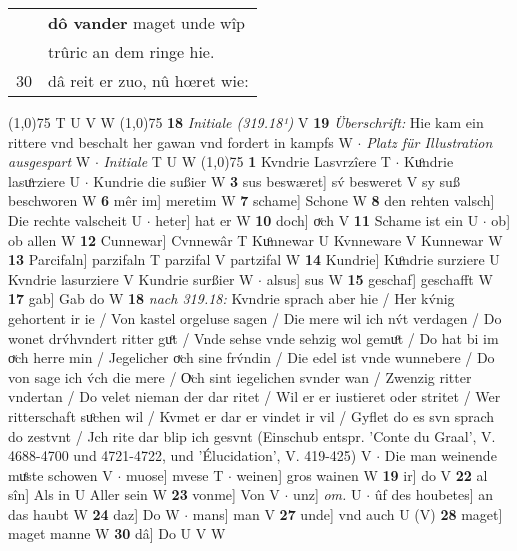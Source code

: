 \documentclass[8pt,a4paper,notitlepage]{article}
\begin{document}
\begin{table}[ht]
\begin{minipage}[t]{0.5\linewidth}
\begin{tabular}{rl}
 & \textbf{dô vander} maget unde wîp\\ 
 & trûric an dem ringe hie.\\ 
30 & dâ reit er zuo, nû hœret wie:\\ 
\end{tabular}
\scriptsize
\line(1,0){75} \newline
T U V W \newline
\line(1,0){75} \newline
\textbf{18} \textit{Initiale (319.18¹)} V  \textbf{19} \textit{Überschrift:} Hie kam ein rittere vnd beschalt her gawan vnd fordert in kampfs W   $\cdot$ \textit{Platz für Illustration ausgespart} W   $\cdot$ \textit{Initiale} T U W  \newline
\line(1,0){75} \newline
\textbf{1} Kvndrie Lasvrzîere T  $\cdot$ Kuͦndrie lasuͦrziere U  $\cdot$ Kundrie die sußier W \textbf{3} sus beswæret] sv́ besweret V sy suß beschworen W \textbf{6} mêr im] meretim W \textbf{7} schame] Schone W \textbf{8} den rehten valsch] Die rechte valscheit U  $\cdot$ heter] hat er W \textbf{10} doch] oͮch V \textbf{11} Schame ist ein U  $\cdot$ ob] ob allen W \textbf{12} Cunnewar] Cvnnewâr T Kuͦnnewar U Kvnneware V Kunnewar W \textbf{13} Parcifaln] parzifaln T parzifal V partzifal W \textbf{14} Kundrie] Kuͦndrie surziere U Kvndrie lasurziere V Kundrie surßier W  $\cdot$ alsus] sus W \textbf{15} geschaf] geschafft W \textbf{17} gab] Gab do W \textbf{18} \textit{nach 319.18:} Kvndrie sprach aber hie / Her kv́nig gehortent ir ie / Von kastel orgeluse sagen / Die mere wil ich nv́t verdagen / Do wonet drv́hvndert ritter guͦt / Vnde sehse vnde sehzig wol gemuͦt / Do hat bi im oͮch herre min / Jegelicher oͮch sine frv́ndin / Die edel ist vnde wunnebere / Do von sage ich v́ch die mere / Oͮch sint iegelichen svnder wan / Zwenzig ritter vndertan / Do velet nieman der dar ritet / Wil er er iustieret oder stritet / Wer ritterschaft suͦchen wil / Kvmet er dar er vindet ir vil / Gyflet do es svn sprach do zestvnt / Jch rite dar blip ich gesvnt (Einschub entspr. 'Conte du Graal', V. 4688-4700 und 4721-4722, und 'Élucidation', V. 419-425) V   $\cdot$ Die man weinende muͤste schowen V  $\cdot$ muose] mvese T  $\cdot$ weinen] gros wainen W \textbf{19} ir] do V \textbf{22} al sîn] Als in U Aller sein W \textbf{23} vonme] Von V  $\cdot$ unz] \textit{om.} U  $\cdot$ ûf des houbetes] an das haubt W \textbf{24} daz] Do W  $\cdot$ mans] man V \textbf{27} unde] vnd auch U (V) \textbf{28} maget] maget manne W \textbf{30} dâ] Do U V W \newline
\end{minipage}
\end{table}
\end{document}
